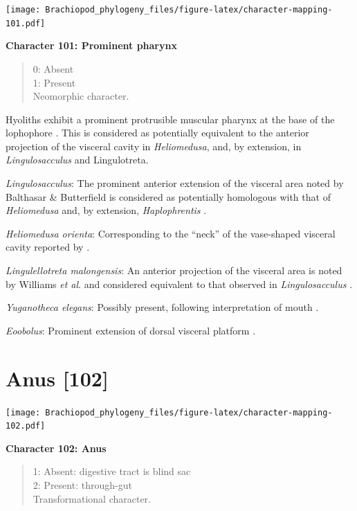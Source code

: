 \documentclass[]{book}
\theoremstyle{definition}
\theoremstyle{definition}
\theoremstyle{definition}
\theoremstyle{remark}
\begin{document}
\texttt{[image: Brachiopod\_phylogeny\_files/figure-latex/character-mapping-101.pdf]}

\textbf{Character 101: Prominent pharynx}

\begin{quote}
0: Absent\\
1: Present\\
Neomorphic character.
\end{quote}

Hyoliths exhibit a prominent protrusible muscular pharynx at the base of
the lophophore \citep{Moysiuk2017Hyolithsare}. This is considered as
potentially equivalent to the anterior projection of the visceral cavity
in \emph{Heliomedusa}, and, by extension, in \emph{Lingulosacculus} and
Lingulotreta.

\emph{Lingulosacculus}: The prominent anterior extension of the visceral
area noted by Balthasar \& Butterfield
\citeyearpar{Balthasar2009EarlyCambrian} is considered as potentially
homologous with that of \emph{Heliomedusa}
\citep{Zhang2009Architectureand} and, by extension, \emph{Haplophrentis}
\citep{Moysiuk2017Hyolithsare}.

\emph{Heliomedusa orienta}: Corresponding to the ``neck'' of the
vase-shaped visceral cavity reported by
\citet{Zhang2009Architectureand}.

\emph{Lingulellotreta malongensis}: An anterior projection of the
visceral area is noted by Williams \emph{et al}.
\citeyearpar{Williams2000BrachiopodaLinguliformea} and considered
equivalent to that observed in \emph{Lingulosacculus}
\citep{Balthasar2009EarlyCambrian}.

\emph{Yuganotheca elegans}: Possibly present, following interpretation
of mouth \citep[see fig. 2c, d in][]{Zhang2014Anearly}.

\emph{Eoobolus}: Prominent extension of dorsal visceral platform
\citep{Balthasar2009Thebrachiopod}.

\hypertarget{anus-102}{%
\section{Anus {[}102{]}}\label{anus-102}}

\texttt{[image: Brachiopod\_phylogeny\_files/figure-latex/character-mapping-102.pdf]}

\textbf{Character 102: Anus}

\begin{quote}
1: Absent: digestive tract is blind sac\\
2: Present: through-gut\\
Transformational character.
\end{quote}
\end{document}

